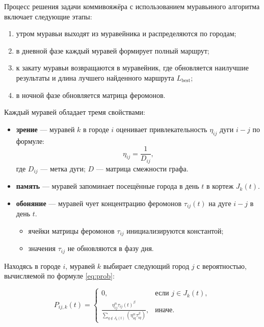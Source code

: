 Процесс решения задачи коммивояжёра с использованием муравьиного алгоритма включает следующие этапы:
\begin{enumerate}
  \item[---] утром муравьи выходят из муравейника и распределяются по городам;
  \item[---] в дневной фазе каждый муравей формирует полный маршрут;
  \item[---] к закату муравьи возвращаются в муравейник, где обновляется наилучшие результаты и длина лучшего найденного маршрута $L_{\text{best}}$;
  \item[---] в ночной фазе обновляется матрица феромонов.
\end{enumerate}

Каждый муравей обладает тремя свойствами:
\begin{itemize}
  \item[---] \textbf{зрение} --- муравей $k$ в городе $i$ оценивает привлекательность $\eta_{ij}$ дуги $i-j$ по формуле:
  \begin{equation}
      \eta_{ij} = \frac{1}{D_{ij}},
  \end{equation}
  где $D_{ij}$ — метка дуги; $D$ --- матрица смежности графа.
  
  \item[---] \textbf{память} --- муравей запоминает посещённые города в день $t$ в кортеж $J_k(t)$.
  
  \item[---] \textbf{обоняние} --- муравей чует концентрацию феромонов $\tau_{ij}(t)$ на дуге $i-j$ в день $t$.
  \begin{itemize}
      \item ячейки матрицы феромонов $\tau_{ij}$ инициализируются константой;
      \item значения $\tau_{ij}$ не обновляются в фазу дня.
  \end{itemize}
\end{itemize}

Находясь в городе $i$, муравей $k$ выбирает следующий город $j$ с вероятностью, вычисляемой по формуле \eqref{eq:prob}:

\begin{equation}
\label{eq:prob}
P_{ij, k}(t) = 
\begin{cases}
  0, &\text{если $j \in J_k(t)$}, \\
  {\displaystyle\frac {\eta_{ij}^{\alpha }\tau_{ij}(t)^{\beta }}{
      \displaystyle\sum_{q \notin J_k(t)} (\eta_{iq}^{\alpha}\tau_{iq}^{\beta })}}, &\text{иначе}.
\end{cases}
\end{equation}

